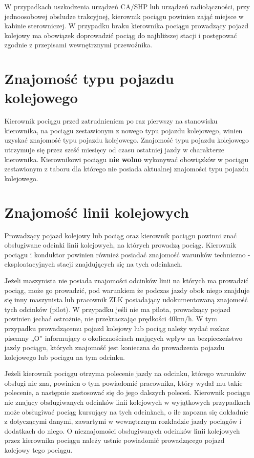 W przypadkach uszkodzenia urządzeń CA/SHP lub urządzeń radiołączności, przy jednoosobowej obsłudze trakcyjnej, kierownik pociągu powinien zająć miejsce w kabinie sterowniczej. W przypadku braku kierownika pociągu prowadzący pojazd kolejowy ma obowiązek doprowadzić pociąg do najbliższej stacji i postępować zgodnie z przepisami wewnętrznymi przewoźnika. 

\section{Znajomość typu pojazdu kolejowego}

Kierownik pociągu przed zatrudnieniem po raz pierwszy na stanowisku kierownika, na pociągu zestawionym z nowego typu pojazdu kolejowego, winien uzyskać znajomość typu pojazdu kolejowego. Znajomość typu pojazdu kolejowego utrzymuje się przez sześć miesięcy od czasu ostatniej jazdy w charakterze kierownika. Kierownikowi pociągu \textbf{nie wolno} wykonywać obowiązków w pociągu zestawionym z taboru dla którego nie posiada aktualnej znajomości typu pojazdu kolejowego. 

\section{Znajomość linii kolejowych}

Prowadzący pojazd kolejowy lub pociąg oraz kierownik pociągu powinni znać obsługiwane odcinki linii kolejowych, na których prowadzą pociąg. Kierownik pociągu i konduktor powinien również posiadać znajomość warunków techniczno - eksploatacyjnych stacji znajdujących się na tych odcinkach. 

Jeżeli maszynista nie posiada znajomości odcinków linii na których ma prowadzić pociąg, może go prowadzić, pod warunkiem że podczas jazdy obok niego znajduje się inny maszynista lub pracownik ZLK posiadający udokumentowaną znajomość tych
odcinków (pilot). W przypadku jeśli nie ma pilota, prowadzący pojazd powinien jechać ostrożnie, nie przekraczając prędkości 40km/h. W tym przypadku prowadzącemu pojazd kolejowy lub pociąg należy wydać rozkaz pisemny „O” informujący o okolicznościach mających wpływ na bezpieczeństwo jazdy pociągu, których znajomość jest konieczna do prowadzenia pojazdu kolejowego lub pociągu na tym odcinku.

Jeżeli kierownik pociągu otrzyma polecenie jazdy na odcinku, którego warunków obsługi nie zna, powinien o tym powiadomić pracownika, który wydał mu takie polecenie, a następnie zastosować się do jego dalszych poleceń. Kierownik pociągu nie znający obsługiwanych odcinków linii kolejowych w wyjątkowych przypadkach może obsługiwać pociąg kursujący na tych odcinkach, o ile zapozna się dokładnie z dotyczącymi danymi, zawartymi w wewnętrznym rozkładzie jazdy pociągów i dodatkach do niego. O nieznajomości obsługiwanych odcinków linii kolejowych przez kierownika pociągu należy ustnie powiadomić prowadzącego pojazd kolejowy tego pociągu.

